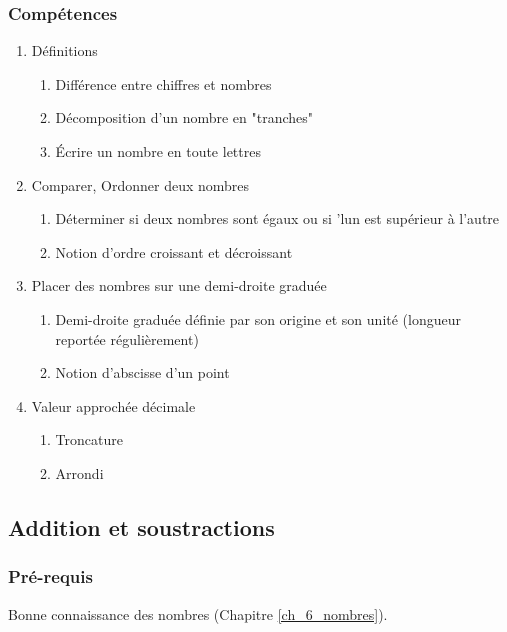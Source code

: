 \subsubsection*{Compétences}
\begin{enumerate}
	\item Définitions
		\begin{enumerate}
			\item Différence entre chiffres et nombres
			\item Décomposition d'un nombre en "tranches"
			\item \'Ecrire un nombre en toute lettres
		\end{enumerate}
	\item Comparer, Ordonner deux nombres
		\begin{enumerate}
			\item Déterminer si deux nombres sont égaux ou si 'lun est supérieur à l'autre
			\item Notion d'ordre croissant et décroissant
		\end{enumerate}
	\item Placer des nombres sur une demi-droite graduée
		\begin{enumerate}
			\item Demi-droite graduée définie par son origine et son unité (longueur reportée régulièrement)
			\item Notion d'abscisse d'un point
		\end{enumerate}
	\item Valeur approchée décimale
		\begin{enumerate}
			\item Troncature
			\item Arrondi
		\end{enumerate}
	
\end{enumerate}


\subsection{Addition et soustractions}\label{ch_6_add}

\subsubsection*{Pré-requis}

Bonne connaissance des nombres (Chapitre \ref{ch_6_nombres}).

